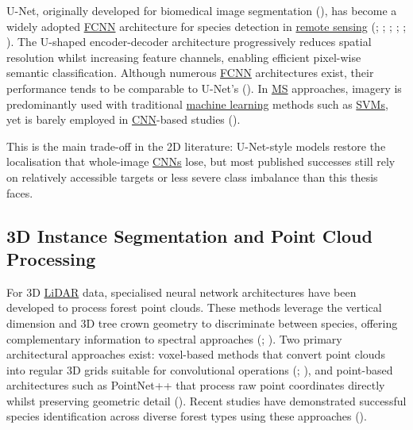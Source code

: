 \documentclass[
]{scrreprt}
\begin{document}
U-Net, originally developed for biomedical image segmentation
(), has become a widely adopted \hyperref[acronyms_FCNN]{FCNN}
architecture for species detection in \hyperref[acronyms_RS]{remote
sensing} (; ; ;
;
;
). The
U-shaped encoder-decoder architecture progressively reduces spatial
resolution whilst increasing feature channels, enabling efficient
pixel-wise semantic classification. Although numerous
\hyperref[acronyms_FCNN]{FCNN} architectures exist, their performance
tends to be comparable to U-Net's
().
In \hyperref[acronyms_MS]{MS} approaches, imagery is predominantly used
with traditional \hyperref[acronyms_ML]{machine learning} methods such
as \hyperref[acronyms_SVM]{SVMs}, yet is barely employed in
\hyperref[acronyms_CNN]{CNN}-based studies
().

This is the main trade-off in the 2D literature: U-Net-style models
restore the localisation that whole-image \hyperref[acronyms_CNN]{CNNs}
lose, but most published successes still rely on relatively accessible
targets or less severe class imbalance than this thesis faces.

\subsection{3D Instance Segmentation and Point Cloud
Processing}\label{d-instance-segmentation-and-point-cloud-processing}

For 3D \hyperref[acronyms_LiDAR]{LiDAR} data, specialised neural network
architectures have been developed to process forest point clouds. These
methods leverage the vertical dimension and 3D tree crown geometry to
discriminate between species, offering complementary information to
spectral approaches (; ). Two primary architectural approaches exist: voxel-based methods
that convert point clouds into regular 3D grids suitable for
convolutional operations
(;
), and
point-based architectures such as PointNet++ that process raw point
coordinates directly whilst preserving geometric detail
(). Recent studies have
demonstrated successful species identification across diverse forest
types using these approaches
().
\end{document}
